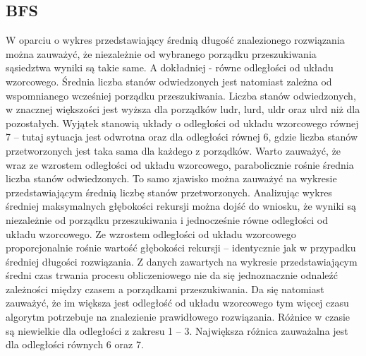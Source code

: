 \documentclass{classrep}
\begin{document}
\subsection{BFS}
{\color{black}
W oparciu o wykres przedstawiający średnią długość znalezionego rozwiązania można zauważyć, że niezależnie od wybranego porządku przeszukiwania sąsiedztwa wyniki są takie same. A dokładniej - równe odległości od układu wzorcowego. Średnia liczba stanów odwiedzonych jest natomiast zależna od wspomnianego wcześniej porządku przeszukiwania. Liczba stanów odwiedzonych, w znacznej większości jest wyższa dla porządków ludr, lurd, uldr oraz ulrd niż dla pozostałych. Wyjątek stanowią układy o odległości od układu wzorcowego równej 7 – tutaj sytuacja jest odwrotna oraz dla odległości równej 6, gdzie liczba stanów przetworzonych jest taka sama dla każdego z porządków. Warto zauważyć, że wraz ze wzrostem odległości od układu wzorcowego, parabolicznie rośnie średnia liczba stanów odwiedzonych. To samo zjawisko można zauważyć na wykresie przedstawiającym średnią liczbę stanów przetworzonych. Analizując wykres średniej maksymalnych głębokości rekursji można dojść do wniosku, że wyniki są niezależnie od porządku przeszukiwania i jednocześnie równe odległości od układu wzorcowego. Ze wzrostem odległości od układu wzorcowego proporcjonalnie rośnie wartość głębokości rekursji – identycznie jak w przypadku średniej długości rozwiązania. 
Z danych zawartych na wykresie przedstawiającym średni czas trwania procesu obliczeniowego nie da się jednoznacznie odnaleźć zależności między czasem a porządkami przeszukiwania. Da się natomiast zauważyć, że im większa jest odległość od układu wzorcowego tym więcej czasu algorytm potrzebuje na znalezienie prawidłowego rozwiązania. Różnice w czasie są niewielkie dla odległości 
z zakresu 1 – 3. Największa różnica zauważalna jest dla odległości równych 6 oraz 7.}
\end{document}
